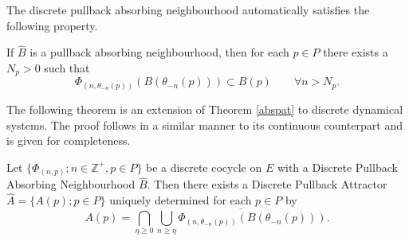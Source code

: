 The discrete pullback absorbing neighbourhood automatically satisfies the
following property.

\begin{lemma} \label{dpanepilem}
If $\hat{B}$ is a pullback absorbing neighbourhood, then for each $p \in P$
there exists a $N_p > 0$ such that
\[ \Phi_{(n,\theta_{-n}(p))}(B(\theta_{-n}(p)))
     \subset B(p) \qquad \forall n > N_p. \]
\end{lemma}

The following theorem is an extension of Theorem \ref{abspat} to discrete
dynamical systems. The proof follows in a similar manner to its
continuous counterpart and is given for completeness.

\begin{therm}
  \label{dabspatthm}
  Let $\{\Phi_{(n,p)};n \in \mathbb{Z}^+, p \in P \}$ be a discrete cocycle
  on $E$ with a Discrete Pullback Absorbing Neighbourhood $\hat{B}$. Then
  there exists a Discrete Pullback Attractor $\hat{A} = \{ A(p); p \in P \}$
  uniquely determined for each $p \in P$ by
  \begin{equation}
  \label{dpatfromabs}
  A(p) = \bigcap_{\eta \geq 0} \overline{\bigcup_{n \geq \eta}
            \Phi_{(n,\theta_{-n}(p))}(B(\theta_{-n}(p)))}.
  \end{equation}
\end{therm}

